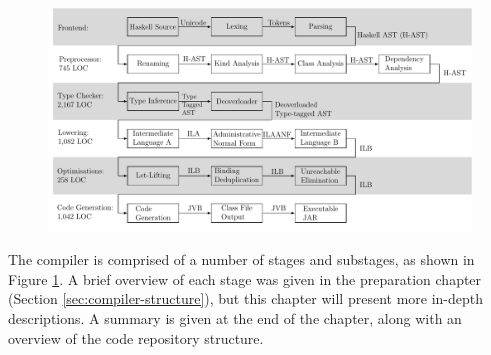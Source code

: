 \documentclass[dissertation.tex]{subfiles}
\begin{document}
\begin{figure}[h]
    \includegraphics[width=\textwidth]{figures/compiler_layout.pdf}
    \caption{}
    \label{fig:compiler-layout}
\end{figure}

The compiler is comprised of a number of stages and substages, as shown in Figure \ref{fig:compiler-layout}. A brief
overview of each stage was given in the preparation chapter (Section \ref{sec:compiler-structure}), but this chapter
will present more in-depth descriptions. A summary is given at the end of the chapter, along with an overview of the
code repository structure.
\end{document}
